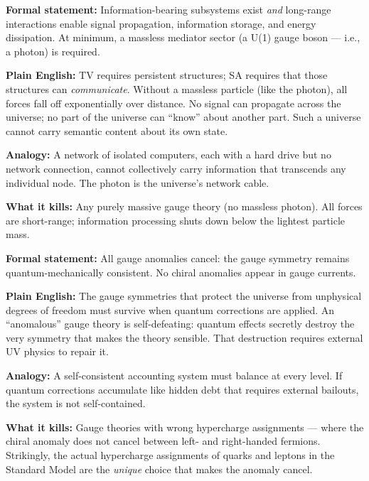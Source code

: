 \documentclass[11pt,a4paper]{article}
\begin{document}
\bigskip

\begin{tcolorbox}[colback=boxgreen,colframe=green!50!black,
  title=Axiom 4 — SA: Semantic Admissibility,breakable]
\textbf{Formal statement:} Information-bearing subsystems exist \emph{and} long-range
interactions enable signal propagation, information storage, and energy dissipation.
At minimum, a massless mediator sector (a U(1) gauge boson — i.e., a photon) is required.

\medskip
\textbf{Plain English:} TV requires persistent structures; SA requires that those
structures can \emph{communicate}.  Without a massless particle (like the photon),
all forces fall off exponentially over distance.  No signal can propagate across the
universe; no part of the universe can ``know'' about another part.  Such a universe
cannot carry semantic content about its own state.

\medskip
\textbf{Analogy:} A network of isolated computers, each with a hard drive but no
network connection, cannot collectively carry information that transcends any
individual node.  The photon is the universe's network cable.

\medskip
\textbf{What it kills:} Any purely massive gauge theory (no massless photon).
All forces are short-range; information processing shuts down below the lightest
particle mass.
\end{tcolorbox}

\bigskip

\begin{tcolorbox}[colback=boxgreen,colframe=green!50!black,
  title=Axiom 5 — AC: Anomaly Consistency,breakable]
\textbf{Formal statement:} All gauge anomalies cancel: the gauge symmetry remains
quantum-mechanically consistent.  No chiral anomalies appear in gauge currents.

\medskip
\textbf{Plain English:} The gauge symmetries that protect the universe from unphysical
degrees of freedom must survive when quantum corrections are applied.  An
``anomalous'' gauge theory is self-defeating: quantum effects secretly destroy the very
symmetry that makes the theory sensible.  That destruction requires external UV physics
to repair it.

\medskip
\textbf{Analogy:} A self-consistent accounting system must balance at every level.
If quantum corrections accumulate like hidden debt that requires external bailouts, the
system is not self-contained.

\medskip
\textbf{What it kills:} Gauge theories with wrong hypercharge assignments — where the
chiral anomaly does not cancel between left- and right-handed fermions.  Strikingly,
the actual hypercharge assignments of quarks and leptons in the Standard Model are
the \emph{unique} choice that makes the anomaly cancel.
\end{tcolorbox}
\end{document}

